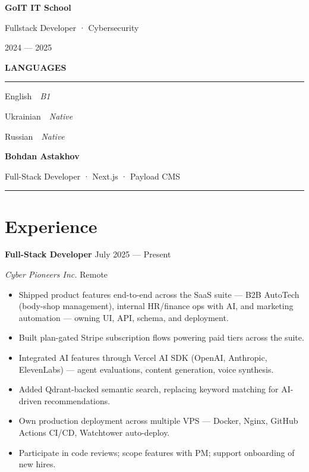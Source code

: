 \documentclass[11pt,a4paper]{article}
\newcommand{\sidebarwidth}{5.8cm}
\newcommand{\sbsection}[1]{%
  \vspace{12pt}\par%
  {\color{accentLite}\normalsize\bfseries\MakeUppercase{#1}}\par%
  \vspace{2pt}%
  {\color{accent!60}\rule{\linewidth}{0.4pt}}\par%
  \vspace{4pt}%
}
\begin{document}
\begin{minipage}[t]{\sidebarwidth}
\begin{minipage}[t]{\dimexpr\sidebarwidth-1.4cm\relax}
{\bfseries GoIT IT School}\par
Fullstack Developer · Cybersecurity\par
{\color{accentLite}2024 — 2025}

\sbsection{Languages}
English\ \ {\color{sidebardim}\itshape B1}\par\vspace{4pt}
Ukrainian\ \ {\color{sidebardim}\itshape Native}\par\vspace{4pt}
Russian\ \ {\color{sidebardim}\itshape Native}

\end{minipage}
\end{minipage}%
%
\begin{minipage}[t]{\dimexpr\paperwidth-\sidebarwidth\relax}
\vspace*{1.1cm}\hspace{0.6cm}%
\begin{minipage}[t]{\dimexpr\paperwidth-\sidebarwidth-1.8cm\relax}

{\Huge\bfseries\color{darkgray}Bohdan Astakhov}\par
\vspace{3pt}
{\large\color{midgray}Full-Stack Developer · Next.js · Payload CMS}\par
\vspace{6pt}
{\color{accent}\rule{\linewidth}{1.2pt}}

\section*{Experience}

{\bfseries Full-Stack Developer} \hfill {\color{midgray}\small July 2025 — Present}\par
{\itshape Cyber Pioneers Inc.} \hfill {\color{midgray}\small Remote}
\begin{itemize}
  \item Shipped product features end-to-end across the SaaS suite —
        B2B AutoTech (body-shop management), internal HR/finance ops
        with AI, and marketing automation — owning UI, API, schema,
        and deployment.
  \item Built plan-gated Stripe subscription flows powering paid tiers
        across the suite.
  \item Integrated AI features through Vercel AI SDK (OpenAI, Anthropic,
        ElevenLabs) — agent evaluations, content generation, voice synthesis.
  \item Added Qdrant-backed semantic search, replacing keyword matching
        for AI-driven recommendations.
  \item Own production deployment across multiple VPS — Docker, Nginx,
        GitHub Actions CI/CD, Watchtower auto-deploy.
  \item Participate in code reviews; scope features with PM; support
        onboarding of new hires.
\end{itemize}


\end{minipage}
\end{minipage}
\end{document}
